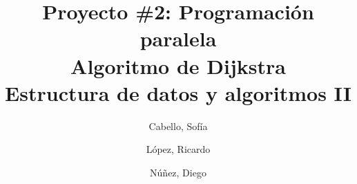 \documentclass[11pt]{article}
\title{Proyecto \#2: Programación paralela\\
Algoritmo de Dijkstra\\
\large Estructura de datos y algoritmos II}
\author{Cabello, Sofía
\and López, Ricardo
\and Núñez, Diego}
\begin{document}
\maketitle{}
  
\end{document}
